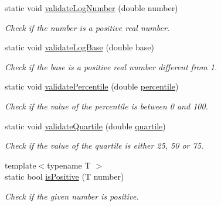 \begin{DoxyCompactItemize}
static void \hyperlink{classmultiscale_1_1Numeric_a284b70a2cd738a3f37a45439aeb0934c}{validate\-Log\-Number} (double number)
\begin{DoxyCompactList}\small\item\em \-Check if the number is a positive real number. \end{DoxyCompactList}\item 
static void \hyperlink{classmultiscale_1_1Numeric_a5d8734939e6074e75f6363ac4cfb8d45}{validate\-Log\-Base} (double base)
\begin{DoxyCompactList}\small\item\em \-Check if the base is a positive real number different from 1. \end{DoxyCompactList}\item 
static void \hyperlink{classmultiscale_1_1Numeric_abe940f7b4f7320912b34590d8297ab7e}{validate\-Percentile} (double \hyperlink{classmultiscale_1_1Numeric_aff0c6b0c3d82bec3761a5e2d08394513}{percentile})
\begin{DoxyCompactList}\small\item\em \-Check if the value of the percentile is between 0 and 100. \end{DoxyCompactList}\item 
static void \hyperlink{classmultiscale_1_1Numeric_aac8bb87dfc3d3f039089c7b1b5225641}{validate\-Quartile} (double \hyperlink{classmultiscale_1_1Numeric_a127a2b3e5e659b4e493767ba23fc45da}{quartile})
\begin{DoxyCompactList}\small\item\em \-Check if the value of the quartile is either 25, 50 or 75. \end{DoxyCompactList}\item 
{\footnotesize template$<$typename T $>$ }\\static bool \hyperlink{classmultiscale_1_1Numeric_ac35688ef6f37f33cdf8f91999c07f414}{is\-Positive} (\-T number)
\begin{DoxyCompactList}\small\item\em \-Check if the given number is positive. \end{DoxyCompactList}\end{DoxyCompactItemize}

